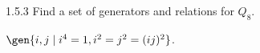 \begin{exercise}{1.5.3}
    Find a set of generators and relations for $Q_8$.
    
\end{exercise}

\begin{sol}
    $\gen{i, j \mid i^4 = 1, i^2 = j^2 = (ij)^2}$.
\end{sol}
